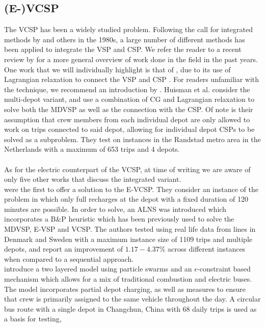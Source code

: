 \documentclass[]{article}
\begin{document}
\subsection{(E-)VCSP}
The VCSP has been a widely studied problem. Following the call for integrated methods by \citet{Bodin1983} and others in the 1980s, a large number of different methods has been applied to integrate the VSP and CSP. We refer the reader to a recent review by \citet{Ge2024} for a more general overview of work done in the field in the past years. \\
One work that we will individually highlight is that of \citet{Huisman2005}, due to its use of Lagrangian relaxation to connect the VSP and CSP . For readers unfamiliar with the technique, we recommend an introduction by \citet{Beasley1993}. Huisman et al. consider the multi-depot variant, and use a combination of CG and Lagrangian relaxation to solve both the MDVSP as well as the connection with the CSP. Of note is their assumption that crew members from each individual depot are only allowed to work on trips connected to said depot, allowing for individual depot CSPs to be solved as a subproblem. They test on instances in the Randstad metro area in the Netherlands with a maximum of 653 trips and 4 depots. \\\\
As for the electric counterpart of the VCSP, at time of writing we are aware of only five other works that discuss the integrated variant. \\
\citet{Perumal2021} were the first to offer a solution to the E-VCSP. They consider an instance of the problem in which only full recharges at the depot with a fixed duration of
120 minutes are possible. In order to solve, an ALNS was introduced which incorporates a B\&P heuristic
which has been previously used to solve the MDVSP, E-VSP and VCSP. The authors tested using real life data from lines in Denmark and Sweden with a
maximum instance size of 1109 trips and multiple depots, and report an improvement of $1.17-4.37\%$
across different instances when compared to a sequential approach. \\
\citet{Wang2022} introduce a two layered model using particle swarms and an
$\epsilon$-constraint based mechanism which allows for a mix of traditional
combustion and electric buses. The model incorporates partial
depot charging, as well as measures to ensure that crew is primarily assigned
to the same vehicle throughout the day. A circular bus route with a single
depot in Changchun, China with 68 daily trips is used as a basis for testing,
\end{document}
